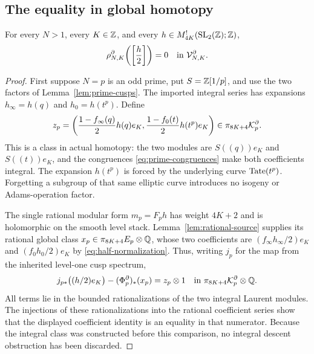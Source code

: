 \subsection{The equality in global homotopy}
\begin{theorem}\label{thm:joint-kill}
For every $N>1$, every $K\in\mathbb Z$, and every
$h\in M_{4K}^!(\mathrm{SL}_2(\mathbb Z);\mathbb Z)$,
\[
 \rho_{N,K}^\partial\!\left(\left[\frac h2\right]\right)=0
 \quad\text{in }\mathcal V_{N,K}^\partial.
\]
\end{theorem}
\begin{proof}
First suppose $N=p$ is an odd prime, put $S=\mathbb Z[1/p]$, and use the
two factors of Lemma~\ref{lem:prime-cusps}. The imported integral
series has expansions $h_\infty=h(q)$ and $h_0=h(t^p)$. Define
\begin{equation}\label{eq:integral-witness}
 z_p=\left(
    \frac{1-f_\infty(q)}2h(q)e_K,
    \frac{1-f_0(t)}2h(t^p)e_K
       \right)\in\pi_{8K+4}\mathcal K_p^\partial.
\end{equation}
This is a class in actual homotopy: the two modules are
$S((q))e_K$ and $S((t))e_K$, and the congruences
\eqref{eq:prime-congruences} make both coefficients integral.
The expansion $h(t^p)$ is forced by the underlying curve $\operatorname{Tate}(t^p)$. Forgetting a subgroup of that same elliptic curve
introduces no isogeny or Adams-operation factor.

The single rational modular form $m_p=F_ph$ has weight $4K+2$ and
is holomorphic on the smooth level stack. Lemma~\ref{lem:rational-source}
supplies its rational global class
$x_p\in\pi_{8K+4}E_p\otimes\mathbb Q$, whose two coefficients are
$(f_\infty h_\infty/2)e_K$ and $(f_0h_0/2)e_K$ by
\eqref{eq:half-normalization}. Thus, writing $j_p$ for the
map from the inherited level-one cusp spectrum,
\begin{equation}\label{eq:global-witness-equality}
 j_{p*}\bigl((h/2)e_K\bigr)
       -(\Phi_p^\partial)_*(x_p)=z_p\otimes1
 \quad\text{in }\pi_{8K+4}\mathcal K_p^\partial\otimes\mathbb Q.
\end{equation}
All terms lie in the bounded rationalizations of the two integral
Laurent modules. The injections of these rationalizations into the
rational coefficient series show that the displayed coefficient
identity is an equality in that numerator. Because the integral class
was constructed before this comparison, no integral descent obstruction
has been discarded.


\end{proof}
